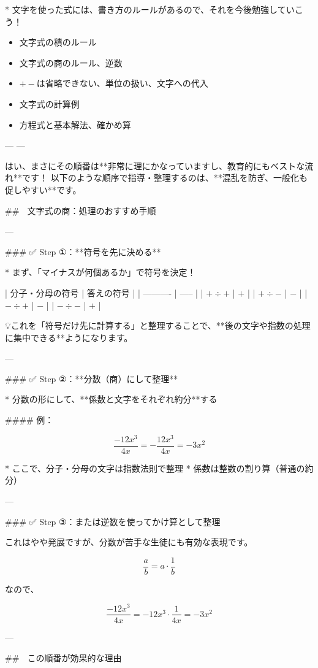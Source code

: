 \documentclass{jsarticle}
\begin{document}
* 文字を使った式には、書き方のルールがあるので、それを今後勉強していこう！\\


\begin{itemize}
\item 文字式の積のルール
\item 文字式の商のルール、逆数
\item $+-$は省略できない、単位の扱い、文字への代入
\item 文字式の計算例
\item 方程式と基本解法、確かめ算
\end{itemize}

---
---

はい、まさにその順番は**非常に理にかなっていますし、教育的にもベストな流れ**です！
以下のような順序で指導・整理するのは、**混乱を防ぎ、一般化も促しやすい**です。

## 🔷 文字式の商：処理のおすすめ手順

---

### ✅ Step ①：**符号を先に決める**

* まず、「マイナスが何個あるか」で符号を決定！

| 分子・分母の符号   | 答えの符号 |
| ---------- | ----- |
| $+ \div +$ | $+$   |
| $+ \div -$ | $-$   |
| $- \div +$ | $-$   |
| $- \div -$ | $+$   |

💡これを「符号だけ先に計算する」と整理することで、**後の文字や指数の処理に集中できる**ようになります。

---

### ✅ Step ②：**分数（商）にして整理**

* 分数の形にして、**係数と文字をそれぞれ約分**する

#### 例：

$$
\frac{-12x^3}{4x} = - \frac{12x^3}{4x} = -3x^2
$$

* ここで、分子・分母の文字は指数法則で整理
* 係数は整数の割り算（普通の約分）

---

### ✅ Step ③：または逆数を使ってかけ算として整理

これはやや発展ですが、分数が苦手な生徒にも有効な表現です。

$$
\frac{a}{b} = a \cdot \frac{1}{b}
$$

なので、

$$
\frac{-12x^3}{4x} = -12x^3 \cdot \frac{1}{4x} = -3x^2
$$

---

## 🔷 この順番が効果的な理由
\end{document}
